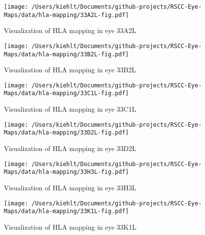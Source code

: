 \documentclass{article}
\begin{document}
\begin{center}
\begin{figure}
\texttt{[image: /Users/kiehlt/Documents/github-projects/RSCC-Eye-Maps/data/hla-mapping/33A2L-fig.pdf]}
\caption{Visualization of HLA mapping in eye 33A2L}
\label{fig:33A2L}
\end{figure}

\end{center}
\begin{center}
\begin{figure}
\texttt{[image: /Users/kiehlt/Documents/github-projects/RSCC-Eye-Maps/data/hla-mapping/33B2L-fig.pdf]}
\caption{Visualization of HLA mapping in eye 33B2L}
\label{fig:33B2L}
\end{figure}

\end{center}
\begin{center}
\begin{figure}
\texttt{[image: /Users/kiehlt/Documents/github-projects/RSCC-Eye-Maps/data/hla-mapping/33C1L-fig.pdf]}
\caption{Visualization of HLA mapping in eye 33C1L}
\label{fig:33C1L}
\end{figure}

\end{center}
\begin{center}
\begin{figure}
\texttt{[image: /Users/kiehlt/Documents/github-projects/RSCC-Eye-Maps/data/hla-mapping/33D2L-fig.pdf]}
\caption{Visualization of HLA mapping in eye 33D2L}
\label{fig:33D2L}
\end{figure}

\end{center}
\begin{center}
\begin{figure}
\texttt{[image: /Users/kiehlt/Documents/github-projects/RSCC-Eye-Maps/data/hla-mapping/33H3L-fig.pdf]}
\caption{Visualization of HLA mapping in eye 33H3L}
\label{fig:33H3L}
\end{figure}

\end{center}
\begin{center}
\begin{figure}
\texttt{[image: /Users/kiehlt/Documents/github-projects/RSCC-Eye-Maps/data/hla-mapping/33K1L-fig.pdf]}
\caption{Visualization of HLA mapping in eye 33K1L}
\label{fig:33K1L}
\end{figure}

\end{center}
\end{document}
